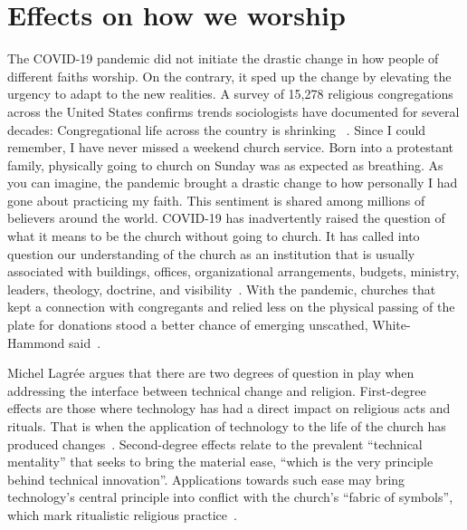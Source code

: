 \section{Effects on how we worship}
The COVID-19 pandemic did not initiate the drastic change in how people of different faiths worship. On the contrary, it sped up the change by elevating the urgency to adapt to the new realities.  A survey of 15,278 religious congregations across the United States confirms trends sociologists have documented for several decades: Congregational life across the country is shrinking ~\cite{smith}.  Since I could remember, I have never missed a weekend church service. Born into a protestant family, physically going to church on Sunday was as expected as breathing. As you can imagine, the pandemic brought a drastic change to how personally I had gone about practicing my faith. This sentiment is shared among millions of believers around the world. COVID-19 has inadvertently raised the question of what it means to be the church without going to church. It has called into question our understanding of the church as an institution that is usually associated with buildings, offices, organizational arrangements, budgets, ministry, leaders, theology, doctrine, and visibility~\cite{jerry:pillay}. With the pandemic, churches that kept a connection with congregants and relied less on the physical passing of the plate for donations stood a better chance of emerging unscathed, White-Hammond said~\cite{sharp}.

Michel Lagrée argues that there are two degrees of question in play when addressing the interface between technical change and religion. First-degree effects are those where technology has had a direct impact on religious acts and rituals. That is when the application of technology to the life of the church has produced changes~\cite{260105620200101}. Second-degree effects relate to the prevalent “technical mentality” that seeks to bring the material ease, “which is the very principle behind technical innovation”. Applications towards such ease may bring technology’s central principle into conflict with the church’s “fabric of symbols”, which mark ritualistic religious practice~\cite{260105620200101}.

